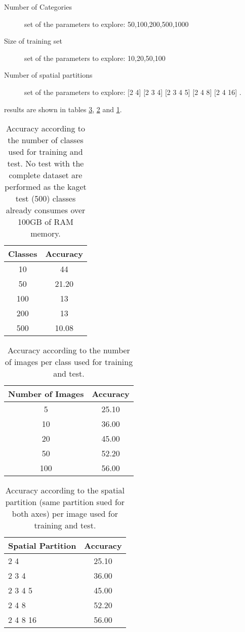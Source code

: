 \documentclass[10pt,twocolumn,letterpaper]{article}
\begin{document}
\begin{description}
\item[Number of Categories] set of the parameters to explore: 50,100,200,500,1000
\item[Size of training set] set of the parameters to explore: 10,20,50,100
\item[Number of spatial partitions] set of the parameters to explore: [2 4]  [2 3 4]  [2 3 4 5]  [2 4 8]  [2 4 16] .
\end{description}

results are shown in tables \ref{table:tableCategories}, \ref{table:tableImages} and \ref{table:tableClases}.

\begin{table}[t]
\centering
\begin{tabular}{c | c }
Classes & Accuracy    \\
\hline	
10 & 44  \\
50 & 21.20 \\
100 & 13 \\
200 & 13 \\
500 & 10.08 \\

\end{tabular}
\caption{Accuracy according to the number of classes used for training and test. No test with the complete dataset are performed as the kaget test (500) classes already consumes over 100GB of RAM memory.
}
\label{table:tableClases}
\end{table}

\begin{table}[t]
\centering
\begin{tabular}{c | c }
Number of Images & Accuracy    \\
\hline	
5 & 25.10  \\
10 & 36.00 \\
20 & 45.00 \\
50 & 52.20 \\
100 & 56.00 \\

\end{tabular}
\caption{Accuracy according to the number of images per class used for training and test.
}
\label{table:tableImages}
\end{table}

\begin{table}[t]
\centering
\begin{tabular}{l | c }
Spatial Partition & Accuracy    \\
\hline	
2 4 & 25.10  \\
2 3 4  & 36.00 \\
2 3 4 5 & 45.00 \\
2 4 8 & 52.20 \\
2 4 8 16 & 56.00 \\

\end{tabular}
\caption{Accuracy according to the spatial partition (same partition sued for both axes) per image used for training and test.
}
\label{table:tableCategories}
\end{table}
\end{document}
